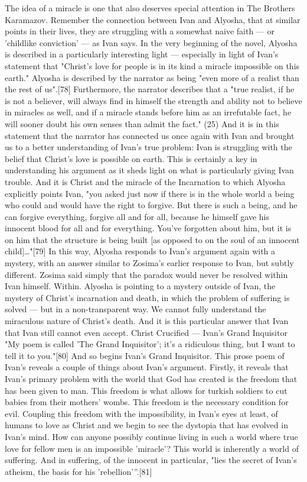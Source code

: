 The idea of a miracle is one that also deserves special attention in The Brothers Karamazov. Remember the connection between Ivan and Alyosha, that at similar points in their lives, they are struggling with a somewhat naive faith — or 'childlike conviction' — as Ivan says. In the very beginning of the novel, Alyosha is described in a particularly interesting light — especially in light of Ivan's statement that "Christ's love for people is in its kind a miracle impossible on this earth." Alyosha is described by the narrator as being "even more of a realist than the rest of us".[78] Furthermore, the narrator describes that a "true realist, if he is not a believer, will always find in himself the strength and ability not to believe in miracles as well, and if a miracle stands before him as an irrefutable fact, he will sooner doubt his own senses than admit the fact." (25) And it is in this statement that the narrator has connected us once again with Ivan and brought us to a better understanding of Ivan's true problem: Ivan is struggling with the belief that Christ's love is possible on earth. This is certainly a key in understanding his argument as it sheds light on what is particularly giving Ivan trouble. And it is Christ and the miracle of the Incarnation to which Alyosha explicitly points Ivan, "you asked just now if there is in the whole world a being who could and would have the right to forgive. But there is such a being, and he can forgive everything, forgive all and for all, because he himself gave his innocent blood for all and for everything. You've forgotten about him, but it is on him that the structure is being built [as opposed to on the soul of an innocent child]…"[79] 
In this way, Alyosha responds to Ivan's argument again with a mystery, with an answer similar to Zosima's earlier response to Ivan, but subtly different. Zosima said simply that the paradox would never be resolved within Ivan himself. Within. Alyosha is pointing to a mystery outside of Ivan, the mystery of Christ's incarnation and death, in which the problem of suffering is solved — but in a non-transparent way. We cannot fully understand the miraculous nature of Christ's death. And it is this particular answer that Ivan that Ivan still cannot even accept.
Christ Crucified — Ivan’s Grand Inquisitor
"My poem is called 'The Grand Inquisitor'; it's a ridiculous thing, but I want to tell it to you."[80] And so begins Ivan's Grand Inquisitor. This prose poem of Ivan's reveals a couple of things about Ivan's argument. Firstly, it reveals that Ivan's primary problem with the world that God has created is the freedom that has been given to man. This freedom is what allows for turkish soldiers to cut babies from their mothers' wombs. This freedom is the necessary condition for evil. Coupling this freedom with the impossibility, in Ivan's eyes at least, of humans to love as Christ and we begin to see the dystopia that has evolved in Ivan's mind. How can anyone possibly continue living in such a world where true love for fellow men is an impossible 'miracle'? This world is inherently a world of suffering. And in suffering, of the innocent in particular, "lies the secret of Ivan's atheism, the basis for his 'rebellion'”.[81]

